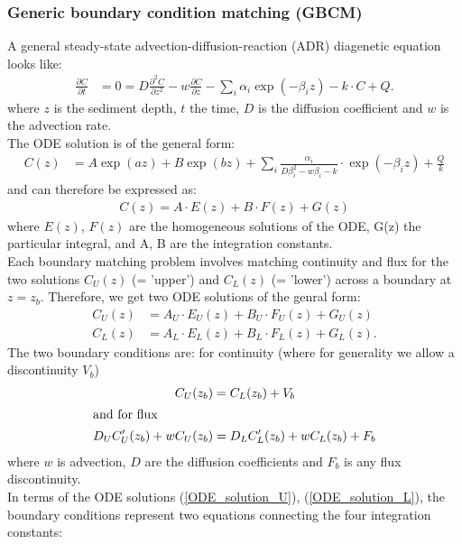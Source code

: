 \documentclass[gmd, manuscript]{copernicus}
\begin{document}
\subsubsection{Generic boundary condition matching (GBCM)}\label{subsec:GBCM}
A general steady-state advection-diffusion-reaction (ADR) diagenetic equation looks like:
\begin{align} 
 \frac{\partial C}{\partial t} &= 0 = D\frac{\partial^2C }{\partial z^2} - w\frac{\partial C }{\partial z} - \sum_i \alpha_i \exp(-\beta_i z) - k\cdot C + Q.
\end{align}
where $z$ is the sediment depth, $t$ the time, $D$ is the diffusion coefficient and $w$ is the advection rate.\\
The ODE solution is of the general form:
\begin{align}
 C(z) &= A \exp(az) + B  \exp(bz) + \sum_i \frac{\alpha_i}{D \beta_i^2-w\beta_i-k}\cdot \exp(-\beta_i z) + \frac{Q}{k}
\end{align}
and can therefore be expressed as:
\begin{align}
C(z) = A \cdot E(z) + B \cdot F(z) + G(z) 
\end{align}
where $E(z)$, $F (z)$ are the homogeneous solutions of the ODE, G(z) the particular integral, and A, B are the integration constants.\\[1em]
Each boundary matching problem involves matching continuity and flux for the two solutions $C_U(z)$ (= 'upper') and $C_L(z)$ (= 'lower') across a boundary at $z = z_b$. Therefore, we get two ODE solutions of the genral form:
\begin{align}
C_U(z) &= A_U \cdot E_U(z) + B_U \cdot F_U(z) + G_U(z) \label{ODE_solution_U}\\
C_L(z) &= A_L \cdot E_L(z) + B_L \cdot F_L(z) + G_L(z) .\label{ODE_solution_L}
\end{align}
The two boundary conditions are: for continuity (where for generality we allow a discontinuity $V_b$) 
\begin{align}
  C_U(z_b) &= C_L(z_b) + V_b	\\
\intertext{and for flux}
 D_U C_U'(z_b) + wC_U(z_b) &=  D_LC_L'(z_b) + wC_L(z_b) + F_b
\end{align}
where $w$ is advection, $D$ are the diffusion coefficients and $F_b$ is any flux discontinuity.\\[1em]
In terms of the ODE solutions (\ref{ODE_solution_U}), (\ref{ODE_solution_L}), the boundary conditions represent two equations connecting the four integration constants:\\
\end{document}
